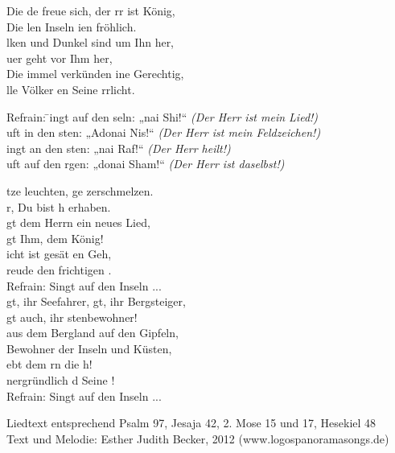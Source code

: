 
Die de freue sich, der rr ist König,\\
Die len Inseln ien fröhlich.\\
lken und Dunkel sind um Ihn her,\\
uer geht vor Ihm her,\\
Die immel verkünden ine Gerechtig,\\
lle Völker en Seine rrlicht.

\begin{tabbing}
Refrain: \= ingt auf den seln: „nai Shi!“ \hspace{30px} \=      \textit{(Der Herr ist mein Lied!)}\\
         \>  uft in den sten: „Adonai Nis!“ \>	\textit{(Der Herr ist mein Feldzeichen!)}\\
         \>  ingt an den sten: „nai Raf!“   \>  \textit{(Der Herr heilt!)}\\
         \>  uft auf den rgen: „donai Sham!“  \>   \textit{(Der Herr ist daselbst!)}
\end{tabbing} 

tze leuchten, ge zerschmelzen.\\
r, Du bist h erhaben.\\
gt dem Herrn ein neues Lied,\\
gt Ihm, dem König!\\
icht ist gesät en Geh,\\
reude den frichtigen .\\

Refrain:          Singt auf den Inseln ...\\

gt, ihr Seefahrer, gt, ihr Bergsteiger,\\
gt auch, ihr stenbewohner!\\
 aus dem Bergland auf den Gipfeln,\\
 Bewohner der Inseln und Küsten,\\
ebt dem rn die h!\\
nergründlich d Seine !\\

Refrain:          Singt auf den Inseln ...\\

\begin{footnotesize}
Liedtext entsprechend Psalm 97, Jesaja 42, 2. Mose 15 und 17, Hesekiel 48\\
Text und Melodie: Esther Judith Becker, 2012 (www.logospanoramasongs.de)
\end{footnotesize}